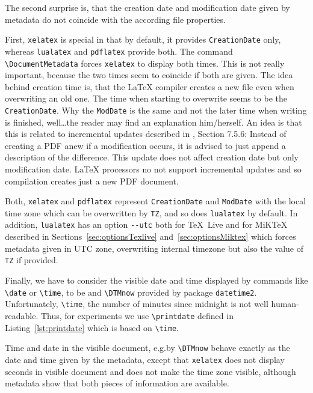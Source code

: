 \documentclass[a4paper, english]{article}%
\newcommand{\pdflatex}{\texttt{pdflatex}}
\newcommand{\lualatex}{\texttt{lualatex}}
\newcommand{\xelatex}{\texttt{xelatex}}
\newcommand{\cmd}[1]{\texttt{\textbackslash#1}}
\newcommand{\texlive}{\TeX~Live}
\newcommand{\miktex}{MiKTeX}
\begin{document}
The second surprise is, that the creation date and modification date given by metadata 
do not coincide with the according file properties. 

First, \xelatex{} is special in that by default, it provides \texttt{CreationDate} only, 
whereas \lualatex{} and \pdflatex{} provide both. 
The command \cmd{DocumentMetadata} forces \xelatex{} to display both times. 
This is not really important, because the two times seem to coincide if both are given. 
The idea behind creation time is, that the \LaTeX{} compiler creates a new file 
even when overwriting an old one. 
The time when starting to overwrite seems to be the \texttt{CreationDate}. 
Why the \texttt{ModDate} is the same and not the later time when writing is finished, 
well\dots the reader may find an explanation him/herself. 
An idea is that this is related to incremental updates described in \cite{Pdf20}, Section 7.5.6: 
Instead of creating a PDF anew if a modification occurs, 
it is advised to just append a description of the difference. 
This update does not affect creation date but only modification date. 
\LaTeX{} processors no not support incremental updates 
and so compilation creates just a new PDF document. 

Both, \xelatex{} and \pdflatex{} represent \texttt{CreationDate} and \texttt{ModDate} 
with the local time zone which can be overwritten by \texttt{TZ}, and so does \lualatex{} by default. 
In addition, \lualatex{} has an option \texttt{-{}-utc} 
both for \texlive{} and for \miktex{} 
described in Sections~\ref{sec:optionsTexlive} and~\ref{sec:optionsMiktex} 
which forces metadata given in UTC zone, 
overwriting internal timezone but also the value of \texttt{TZ} if provided. 
\medskip


Finally, we have to consider the visible date and time 
displayed by commands like \cmd{date} or \cmd{time}, to be 
and \cmd{DTMnow} provided by package \texttt{datetime2}. 
Unfortunately, \cmd{time}, the number of minutes since midnight is not well human-readable. 
Thus, for experiments we use \cmd{printdate} defined in Listing~\ref{lst:printdate} 
which is based on \cmd{time}. 








Time and date in the visible document, e.g.\@ by \cmd{DTMnow} 
behave exactly as the date and time given by the metadata, 
except that \xelatex{} does not display seconds in visible document 
and does not make the time zone visible, 
although metadata show that both pieces of information are available. 
\end{document}
